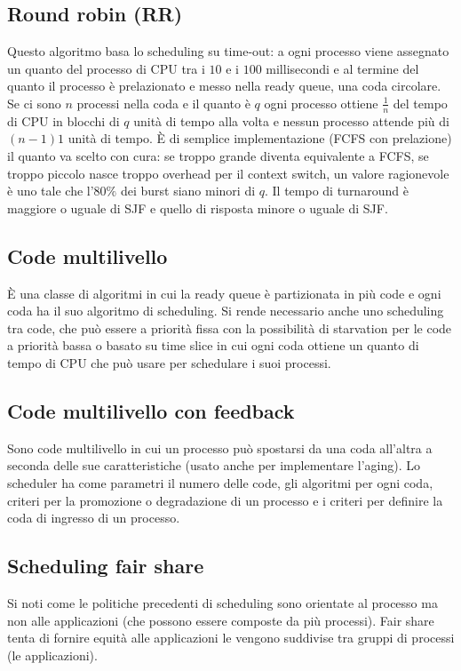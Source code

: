\subsection{Round robin (RR)}
Questo algoritmo basa lo scheduling su time-out: a ogni processo viene assegnato un quanto del processo di CPU tra i $10$ e i $100$ millisecondi e al termine del quanto il processo \`e
prelazionato e messo nella ready queue, una coda circolare. Se ci sono $n$ processi nella coda e il quanto \`e $q$ ogni processo ottiene $\frac{1}{n}$ del tempo di CPU in blocchi di 
$q$ unit\`a di tempo alla volta e nessun processo attende pi\`u di $(n-1)1$ unit\`a di tempo. \`E di semplice implementazione (FCFS con prelazione) il quanto va scelto con cura: 
se troppo grande diventa equivalente a FCFS, se troppo piccolo nasce troppo overhead per il context switch, un valore ragionevole \`e uno tale che l'$80\%$ dei burst siano minori di $q$.
Il tempo di turnaround \`e maggiore o uguale di SJF e quello di risposta minore o uguale di SJF. 
\subsection{Code multilivello}
\`E una classe di algoritmi in cui la ready queue \`e partizionata in pi\`u code e ogni coda ha il suo algoritmo di scheduling. Si rende necessario anche uno scheduling tra code, che
pu\`o essere a priorit\`a fissa con la possibilit\`a di starvation per le code a priorit\`a bassa o basato su time slice in cui ogni coda ottiene un quanto di tempo di CPU che pu\`o 
usare per schedulare i suoi processi. 
\subsection{Code multilivello con feedback}
Sono code multilivello in cui un processo pu\`o spostarsi da una coda all'altra a seconda delle sue caratteristiche (usato anche per implementare l'aging). Lo scheduler ha come parametri
il numero delle code, gli algoritmi per ogni coda, criteri per la promozione o degradazione di un processo e i criteri per definire la coda di ingresso di un processo. 
\subsection{Scheduling fair share}
Si noti come le politiche precedenti di scheduling sono orientate al processo ma non alle applicazioni (che possono essere composte da pi\`u processi). Fair share tenta di fornire
equit\`a alle applicazioni le vengono suddivise tra gruppi di processi (le applicazioni). 
